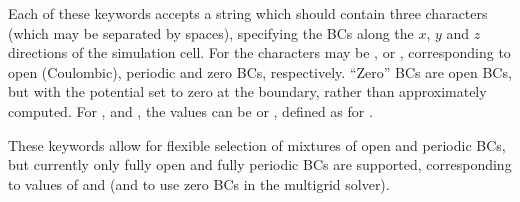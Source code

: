 \documentclass[letterpaper,10pt,english]{sphinxmanual}
\begin{document}
Each of these keywords accepts a string which should contain three
characters (which may be separated by spaces), specifying the BCs along
the \(x\), \(y\) and \(z\) directions of the simulation
cell. For  the characters may be ,  or ,
corresponding to open (Coulombic), periodic and zero BCs, respectively.
“Zero” BCs are open BCs, but with the potential set to zero at the
boundary, rather than approximately computed. For ,
 and , the values can be  or ,
defined as for .

These keywords allow for flexible selection of mixtures of open and
periodic BCs, but currently only fully open and fully periodic BCs are
supported, corresponding to values of  and  (and
 to use zero BCs in the multigrid solver).
\end{document}
